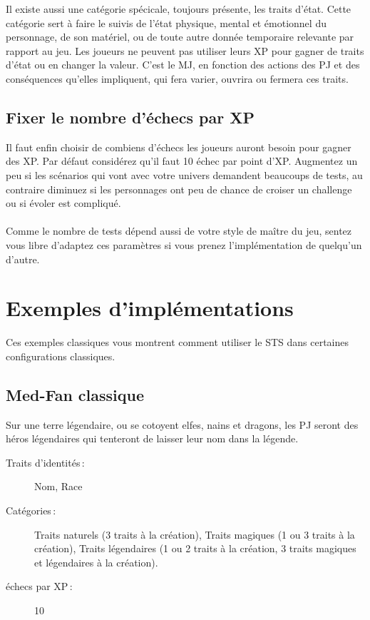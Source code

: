 \documentclass[a4paper,10pt,twoside,twocolumn]{article}
\begin{document}
Il existe aussi une catégorie spécicale, toujours présente, les traits d'état. Cette catégorie sert à faire le suivis de l'état physique, mental et émotionnel du personnage, de son matériel, ou de toute autre donnée temporaire relevante par rapport au jeu. Les joueurs ne peuvent pas utiliser leurs XP pour gagner de traits d'état ou en changer la valeur. C'est le MJ, en fonction des actions des PJ et des conséquences qu'elles impliquent, qui fera varier, ouvrira ou fermera ces traits.
 
 \subsection{Fixer le nombre d'échecs par XP}
 \label{implem::xp}
 
 Il faut enfin choisir de combiens d'échecs les joueurs auront besoin pour gagner des XP. Par défaut considérez qu'il faut 10 échec par point d'XP. Augmentez un peu si les scénarios qui vont avec votre univers demandent beaucoups de tests, au contraire diminuez si les personnages ont peu de chance de croiser un challenge ou si évoler est compliqué.\\
 \\
 Comme le nombre de tests dépend aussi de votre style de maître du jeu, sentez vous libre d'adaptez ces paramètres si vous prenez l'implémentation de quelqu'un d'autre.
 
 \section{Exemples d'implémentations}
 \label{exempl}
 
 Ces exemples classiques vous montrent comment utiliser le STS dans certaines configurations classiques.
 
 \subsection{Med-Fan classique}
 
 Sur une terre légendaire, ou se cotoyent elfes, nains et dragons, les PJ seront des héros légendaires qui tenteront de laisser leur nom dans la légende. 
 
 \begin{description}
  \item [Traits d'identités\,:] Nom, Race
  \item [Catégories\,:] Traits naturels (3 traits à la création), Traits magiques (1 ou 3 traits à la création), Traits légendaires (1 ou 2 traits à la création, 3 traits magiques et légendaires à la création).
  \item [échecs par XP\,:] 10
 \end{description}
 
\end{document}
